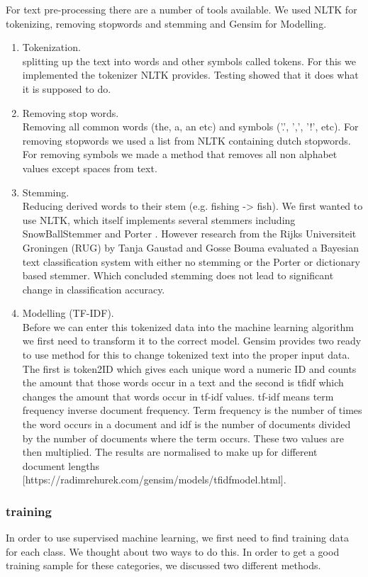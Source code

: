 For text pre-processing there are a number of tools available. We used NLTK \cite{nlkt_stemming} for tokenizing, removing stopwords and stemming and Gensim \cite{Gensim} for Modelling.
\begin{enumerate}
\item Tokenization. \\ splitting up the text into words and other symbols called tokens. For this we implemented the tokenizer NLTK provides. Testing showed that it does what it is supposed to do.
\item Removing stop words. \\ Removing all common words (the, a, an etc) and symbols ('.', ',', '!', etc). For removing stopwords we used a list from NLTK containing dutch stopwords. For removing symbols we made a method that removes all non alphabet values except spaces from text. 
\item Stemming. \\ Reducing derived words to their stem (e.g. fishing -> fish). We first wanted to use NLTK, which itself implements several stemmers including SnowBallStemmer \cite{snowball_dutch} and Porter \cite{porter_Stemmer}. However research from the Rijks Universiteit Groningen (RUG) by Tanja Gaustad and Gosse Bouma \cite{gaustad2002accurate} evaluated a Bayesian text classification system with either no stemming or the Porter or dictionary based stemmer. Which concluded stemming does not lead to significant change in classification accuracy.

\item Modelling (TF-IDF). \\ Before we can enter this tokenized data into the machine learning algorithm we first need to transform it to the correct model. Gensim provides two ready to use method for this to change tokenized text into the proper input data. The first is token2ID which gives each unique word a numeric ID and counts the amount that those words occur in a text and the second is tfidf which changes the amount that words occur in tf-idf values. tf-idf means term frequency inverse document frequency. Term frequency is the number of times the word occurs in a document and idf is the number of documents divided by the number of documents where the term occurs. These two values are then multiplied. The results are normalised to make up for different document lengths [https://radimrehurek.com/gensim/models/tfidfmodel.html].
\end{enumerate}

\subsubsection{training}
In order to use supervised machine learning, we first need to find training data for each class. We thought about two ways to do this. In order to get a good training sample for these categories, we discussed two different methods. \\

